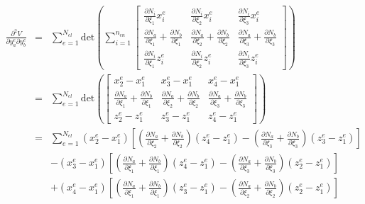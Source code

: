 \documentclass[12pt,aps,pre]{revtex4}
\begin{document}
\begin{eqnarray}
\frac{\partial^2 V}{\partial y_a^e \partial y_b^e} &=& \sum_{e=1}^{N_{el}} \text{det}\left(\sum_{i=1}^{n_{en}} \begin{bmatrix}
\frac{\partial N_i}{\partial \xi_1}x_i^e  & \frac{\partial N_i}{\partial \xi_2}x_i^e  & \frac{\partial N_i}{\partial \xi_3}x_i^e  \\
%
\frac{\partial N_a}{\partial \xi_1}+\frac{\partial N_b}{\partial \xi_1} & \frac{\partial N_a}{\partial \xi_2}+\frac{\partial N_b}{\partial \xi_2}& \frac{\partial N_a}{\partial \xi_3}+\frac{\partial N_b}{\partial \xi_3} \\
%
\frac{\partial N_i}{\partial \xi_1}z_i^e & \frac{\partial N_i}{\partial \xi_2}z_i^e & \frac{\partial N_i}{\partial \xi_3}z_i^e 
\end{bmatrix}\right) \nonumber\\
&=& \sum_{e=1}^{N_{el}} \text{det}\left( \begin{bmatrix}
x_2^e - x_1^e & x_3^e - x_1^e & x_4^e - x_1^e \\
%
\frac{\partial N_a}{\partial \xi_1}+\frac{\partial N_b}{\partial \xi_1} & \frac{\partial N_a}{\partial \xi_2}+\frac{\partial N_b}{\partial \xi_2}& \frac{\partial N_a}{\partial \xi_3}+\frac{\partial N_b}{\partial \xi_3} \\
%
z_2^e - z_1^e & z_3^e - z_1^e & z_4^e - z_1^e 
\end{bmatrix}\right) \nonumber\\
%
&=&\sum_{e=1}^{N_{el}}(x_2^e - x_1^e)\left[\left(\frac{\partial N_a}{\partial \xi_2}+\frac{\partial N_b}{\partial \xi_2}\right)(z_4^e - z_1^e)-\left(\frac{\partial N_a}{\partial \xi_3}+\frac{\partial N_b}{\partial \xi_3}\right)(z_3^e - z_1^e)\right] \nonumber\\
%
&&-(x_3^e - x_1^e)\left[\left(\frac{\partial N_a}{\partial \xi_1}+\frac{\partial N_b}{\partial \xi_1}\right)(z_4^e - z_1^e)-\left(\frac{\partial N_a}{\partial \xi_3}+\frac{\partial N_b}{\partial \xi_3}\right)(z_2^e - z_1^e)\right] \nonumber\\
%
&&+(x_4^e - x_1^e)\left[\left(\frac{\partial N_a}{\partial \xi_1}+\frac{\partial N_b}{\partial \xi_1}\right)(z_3^e - z_1^e)-\left(\frac{\partial N_a}{\partial \xi_2}+\frac{\partial N_b}{\partial \xi_2}\right)(z_2^e - z_1^e)\right] 
\end{eqnarray}
\end{document}

